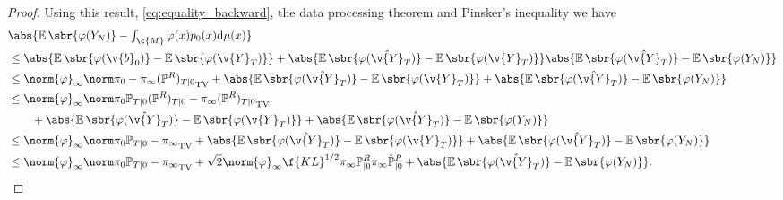 \begin{proof}
	Using this result, \eqref{eq:equality_backward}, the data processing theorem \cite[Theorem 4.1]{kullback1997information} and Pinsker's inequality \cite[Equation 5.2.2]{bakry:gentil:ledoux:2014} we have \begin{align}  & \textstyle{\abs{\E\sbr{\varphi(Y_N)} - \int_\c{M} \varphi(x) p_0(x) \mathrm{d} \mu(x)}} \\ & \leq \abs{\E\sbr{\varphi(\v{b}_0)} - \E\sbr{\varphi(\v{Y}_T)}} + \abs{\E\sbr{\varphi(\hat{\v{Y}}_T)} - \E\sbr{\varphi(\v{Y}_T)}} \abs{\E\sbr{\varphi(\hat{\v{Y}}_T)} - \E\sbr{\varphi(Y_N)}} \\ & \leq \norm{\varphi}_\infty \tvnorm{\pi_0 - \pi_{\infty} (\mathbb{P}^R)_{T|0}} + \abs{\E\sbr{\varphi(\hat{\v{Y}}_T)} - \E\sbr{\varphi(\v{Y}_T)}} + \abs{\E\sbr{\varphi(\hat{\v{Y}}_T)} - \E\sbr{\varphi(Y_N)}} \\ & \leq \norm{\varphi}_\infty \tvnorm{\pi_0 \bb{P}_{T|0} (\bb{P}^R)_{T|0} - \pi_{\infty} (\mathbb{P}^R)_{T|0}} \\& \qquad + \abs{\E\sbr{\varphi(\hat{\v{Y}}_T)} - \E\sbr{\varphi(\v{Y}_T)}} + \abs{\E\sbr{\varphi(\hat{\v{Y}}_T)} - \E\sbr{\varphi(Y_N)}} \\ & \leq \norm{\varphi}_\infty \tvnorm{\pi_0 \bb{P}_{T|0} - \pi_{\infty} } + \abs{\E\sbr{\varphi(\hat{\v{Y}}_T)} - \E\sbr{\varphi(\v{Y}_T)}} + \abs{\E\sbr{\varphi(\hat{\v{Y}}_T)} - \E\sbr{\varphi(Y_N)}} \\ & \leq \norm{\varphi}_\infty \tvnorm{\pi_0 \bb{P}_{T|0} - \pi_{\infty} } + \sqrt{2}\norm{\varphi}_\infty\f{KL}^{1/2}{\pi_{\infty}\bb{P}^R_{|0}}{\pi_{\infty}\hat{\bb{P}}^R_{|0}} + \abs{\E\sbr{\varphi(\hat{\v{Y}}_T)} - \E\sbr{\varphi(Y_N)}} .
	\end{align}


\end{proof}
